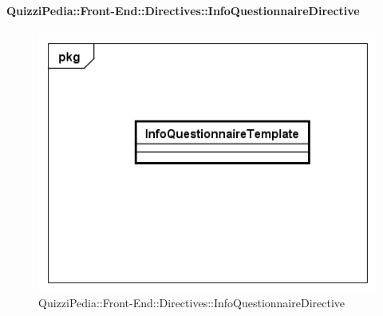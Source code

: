 		\paragraph{QuizziPedia::Front-End::Directives::InfoQuestionnaireDirective}
		
		\label{QuizziPedia::Front-End::Directives::InfoQuestionnaireDirective}
		
		\begin{figure}[ht]
			\centering
			\includegraphics[scale=0.80,keepaspectratio]{UML/Classi/Front-End/QuizziPedia_Front-end_Templates_InfoQuestionnaireTemplate.png}
			\caption{QuizziPedia::Front-End::Directives::InfoQuestionnaireDirective}
		\end{figure} \FloatBarrier
		
